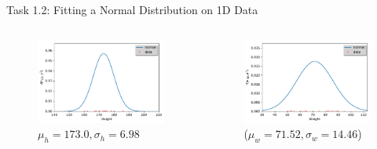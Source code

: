 \documentclass{beamer}
\begin{document}
\begin{frame}{Task 1.2: Fitting a Normal Distribution on 1D Data}
\begin{columns}
\begin{column}{0.5\textwidth}  
\begin{figure}
	\includegraphics[width=1\textwidth]{images/plotNormal_Height.pdf}	\caption{$\mu_h=173.0, \sigma_h=6.98$}
\end{figure}
\end{column}
\begin{column}{0.5\textwidth}  
	\begin{figure}
		\includegraphics[width=1\textwidth]{images/plotNormal_Weight.pdf} \caption{($\mu_w=71.52, \sigma_w=14.46$)}
	\end{figure}
\end{column}
\end{columns}

\end{frame}
\end{document}
